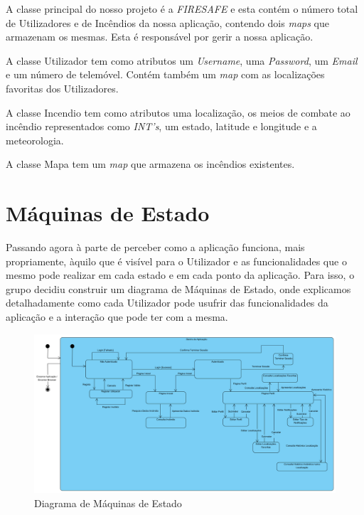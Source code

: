 \documentclass[a4paper,12pt]{scrreprt}
\newcommand{\tab}{
    \hspace{1cm}}
\begin{document}
\tab A classe principal do nosso projeto é a \textit{FIRESAFE} e esta contém o número total de Utilizadores e de Incêndios da nossa aplicação, contendo dois \textit{maps} que armazenam os mesmas. Esta é responsável por gerir a nossa aplicação.

\tab A classe Utilizador tem como atributos um \textit{Username}, uma \textit{Password}, um \textit{Email} e um número de telemóvel. Contém também um \textit{map} com as localizações favoritas dos Utilizadores.

\tab A classe Incendio tem como atributos uma localização, os meios de combate ao incêndio representados como \textit{INT's}, um estado, latitude e longitude e a meteorologia.

\tab A classe Mapa tem um \textit{map} que armazena os incêndios existentes.


\chapter{Máquinas de Estado}
\tab Passando agora à parte de perceber como a aplicação funciona, mais propriamente, àquilo que é visível para o Utilizador e as funcionalidades que o mesmo pode realizar em cada estado e em cada ponto da aplicação. Para isso, o grupo decidiu construir um diagrama de Máquinas de Estado, onde explicamos detalhadamente como cada Utilizador pode usufrir das funcionalidades da aplicação e a interação que pode ter com a mesma.

\vspace{1.5cm}

\begin{figure}[hbt!]
    \centering
    \includegraphics[width=1\textwidth]{images/Fase2/9.MaquinasDeEstado/diagramaEstado.png}
    \caption{Diagrama de Máquinas de Estado}
\end{figure}
\end{document}
